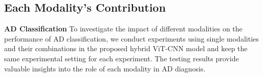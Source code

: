 
\begin{table}[ht]
\caption{Modality testing results comparison using the hybrid ViT-CNN model in the same experiments settings with same subjects of two different datasets.}\label{tab:results-cls-modality}
\end{table}
\subsection{Each Modality’s Contribution}
\textbf{AD Classification}
To investigate the impact of different modalities on the performance of AD classification, we conduct experiments using single modalities and their combinations in the proposed hybrid ViT-CNN model and keep the same experimental setting for each experiment. The testing results provide valuable insights into the role of each modality in AD diagnosis. 

